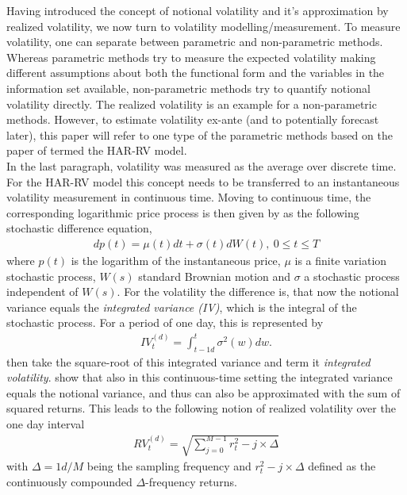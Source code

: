 Having introduced the concept of notional volatility and it's approximation by realized volatility, we now turn to volatility modelling/measurement. To measure volatility, one can separate between parametric and non-parametric methods. Whereas parametric methods try to measure the expected volatility making different assumptions about both the functional form and the variables in the information set available, non-parametric methods try to quantify notional volatility directly. The realized volatility is an example for a non-parametric methods. However, to estimate volatility ex-ante (and to potentially forecast later), this paper will refer to one type of the parametric methods based on the paper of \textcite{corsi2009} termed the HAR-RV model.\\
In the last paragraph, volatility was measured as the average over discrete time. For the HAR-RV model this concept needs to be transferred to an instantaneous volatility measurement in continuous time. Moving to continuous time, the corresponding logarithmic price process is then given by \textcite{corsi2009} as the following stochastic difference equation,
\begin{align}\label{eq:return-process-corsi}
dp(t) = \mu(t)dt + \sigma(t)dW(t), \ 0 \leq t \leq T
\end{align}
where $p(t)$ is the logarithm of the instantaneous price, $\mu$ is a finite variation stochastic process, $W(s)$ standard Brownian motion and $\sigma$ a stochastic process independent of $W(s)$. For the volatility the difference is, that now the notional variance equals the \emph{integrated variance (IV)}, which is the integral of the stochastic process. For a period of one day, this is represented by
\begin{align}
IV_{t}^{(d)} =  \int_{t-1d}^{t} \sigma^{2}(w)dw.
\end{align}
\textcite{corsi2009} then take the square-root of this integrated variance and term it \emph{integrated volatility}. \textcite{andersen2001} show that also in this continuous-time setting the integrated variance equals the notional variance, and thus can also be approximated with the sum of squared returns. This leads to the following notion of realized volatility over the one day interval
\begin{align}
RV_{t}^{(d)} = \sqrt{\sum_{j=0}^{M-1} r^{2}_t-j \times \Delta}
\end{align}
with $\Delta = 1d/M$ being the sampling frequency and $r^{2}_t-j \times \Delta$ defined as the continuously compounded $\Delta$-frequency returns. \\

